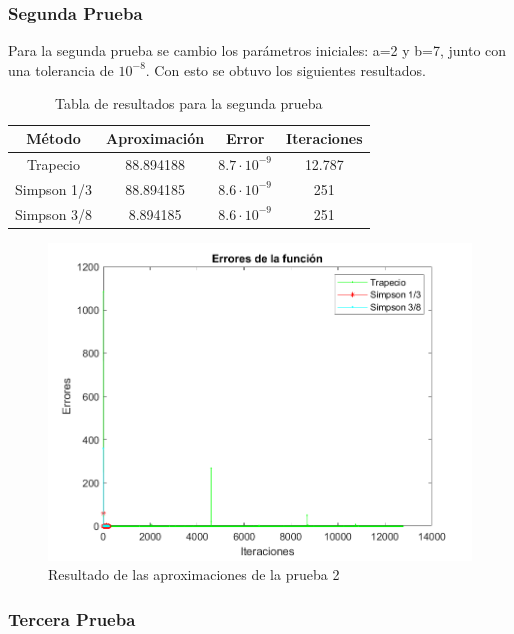\subsubsection{Segunda Prueba}

\par Para la segunda prueba se cambio los parámetros iniciales: a=2 y b=7, junto con una tolerancia de $10^{-8}$. Con esto se obtuvo los siguientes resultados.

\begin{table}[htp]
	\centering
	\begin{tabular}{ |c|c|c|c|}
		\hline
		\textbf{Método} & \textbf{Aproximación} & \textbf{Error} & \textbf{Iteraciones} \\
		\hline
		Trapecio & 88.894188 & $8.7 \cdot 10^{-9}$ & 12.787  \\
		\hline
		Simpson 1/3 & 88.894185 & $8.6 \cdot 10^{-9}$ & 251  \\
		\hline
		Simpson 3/8 & 8.894185 & $8.6 \cdot 10^{-9}$ & 251 \\
		\hline
	\end{tabular}
	\caption{Tabla de resultados para la segunda prueba}
	\label{tab:tab3}
\end{table}


\begin{figure}[!ht]
	\centering
	\includegraphics[scale=0.8]{Imagenes/erroresFuncion2.png}
	\caption{Resultado de las aproximaciones de la prueba 2}
	\label{fig:ej}
\end{figure}

\newpage

\subsubsection{Tercera Prueba}

